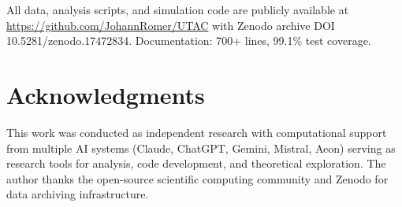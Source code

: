\documentclass[11pt,letterpaper]{article}
\begin{document}
All data, analysis scripts, and simulation code are publicly available at \url{https://github.com/JohannRomer/UTAC} with Zenodo archive DOI 10.5281/zenodo.17472834. Documentation: 700+ lines, 99.1\% test coverage.

\section*{Acknowledgments}

This work was conducted as independent research with computational support from multiple AI systems (Claude, ChatGPT, Gemini, Mistral, Aeon) serving as research tools for analysis, code development, and theoretical exploration. The author thanks the open-source scientific computing community and Zenodo for data archiving infrastructure.


\end{document}
